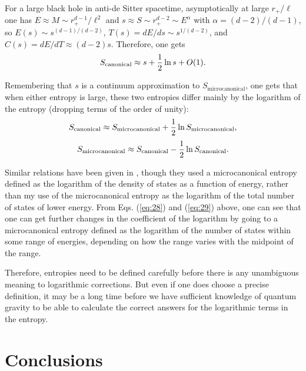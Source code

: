 \documentclass[12pt]{article} \usepackage{latexsym} \textwidth 15cm
\begin{document}
For a large black hole in anti-de Sitter spacetime, asymptotically at
large $r_+/\ell$ one has $E \approx M \sim r_+^{d-1}/\ell^2$ and $s
\approx S \sim r_+^{d-2} \sim E^\alpha$ with $\alpha = (d-2)/(d-1)$, so
$E(s) \sim s^{(d-1)/(d-2)}$, $T(s) = dE/ds \sim s^{1/(d-2)}$, and $C(s)
= dE/dT \approx (d-2)s$.  Therefore, one gets
 \begin{equation}
 S_{\mathrm{canonical}} \approx s + {1\over 2}\ln{s} + O(1).
 \label{eq:38}
 \end{equation}

Remembering that $s$ is a continuum approximation to
$S_{\mathrm{microcanonical}}$, one gets that when either entropy is
large, these two entropies differ mainly by the logarithm of the
entropy (dropping terms of the order of unity):
 \begin{equation}
  S_{\mathrm{canonical}} \approx S_{\mathrm{microcanonical}}
   + {1\over 2}\ln{S_{\mathrm{microcanonical}}},
 \label{eq:39} \end{equation}
 \begin{equation}
  S_{\mathrm{microcanonical}} \approx S_{\mathrm{canonical}}
   - {1\over 2}\ln{S_{\mathrm{canonical}}}.
 \label{eq:40}
  \end{equation}

Similar relations have been given in \cite{DMB,CM2}, though they used a
microcanonical entropy defined as the logarithm of the density of
states as a function of energy, rather than my use of the
microcanonical entropy as the logarithm of the total number of states
of lower energy.  From Eqs. (\ref{eq:28}) and (\ref{eq:29}) above, one
can see that one can get further changes in the coefficient of the
logarithm by going to a microcanonical entropy defined as the logarithm
of the number of states within some range of energies, depending on how
the range varies with the midpoint of the range.

Therefore, entropies need to be defined carefully before there is any
unambiguous meaning to logarithmic corrections.  But even if one does
choose a precise definition, it may be a long time before we have
sufficient knowledge of quantum gravity to be able to calculate the
correct answers for the logarithmic terms in the entropy.

\section{Conclusions}
\end{document}
